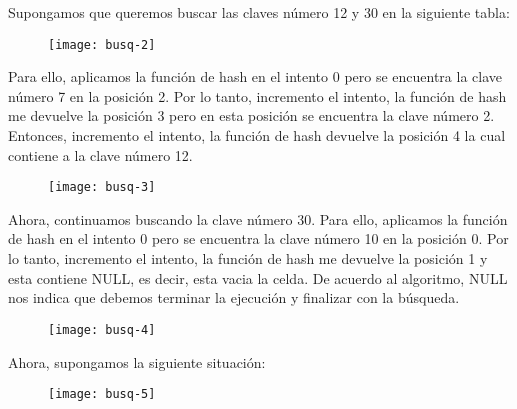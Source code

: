 \documentclass[10pt,a4paper]{article}
\begin{document}
\newline 
Supongamos que queremos buscar las claves número 12 y 30 en la siguiente tabla:
\newline
\begin{figure}[h]
	\centering
\texttt{[image: busq-2]}
	\label{drivers1}
\end{figure}
\medskip
\medskip
Para ello, aplicamos la función de hash en el intento 0 pero se encuentra la clave número 7 en la posición 2. Por lo tanto, incremento el intento, la función de hash me devuelve la posición 3 pero en esta posición se encuentra la clave número 2. Entonces, incremento el intento, la función de hash devuelve la posición 4 la cual contiene a la clave número 12.
\newline
\begin{figure}[h]
	\centering
\texttt{[image: busq-3]}
	\label{drivers1}
\end{figure}
\newpage
Ahora, continuamos buscando la clave número 30. Para ello, aplicamos la función de hash en el intento 0 pero se encuentra la clave número 10 en la posición 0. Por lo tanto, incremento el intento, la función de hash me devuelve la posición 1 y esta contiene NULL, es decir, esta vacia la celda. De acuerdo al algoritmo, NULL nos indica que debemos terminar la ejecución y finalizar con la búsqueda.
\newline
\begin{figure}[h]
	\centering
\texttt{[image: busq-4]}
	\label{drivers1}
\end{figure}
\newpage
Ahora, supongamos la siguiente situación:
\newline
\begin{figure}[h]
	\centering
\texttt{[image: busq-5]}
	\label{drivers1}
\end{figure}
\end{document}
